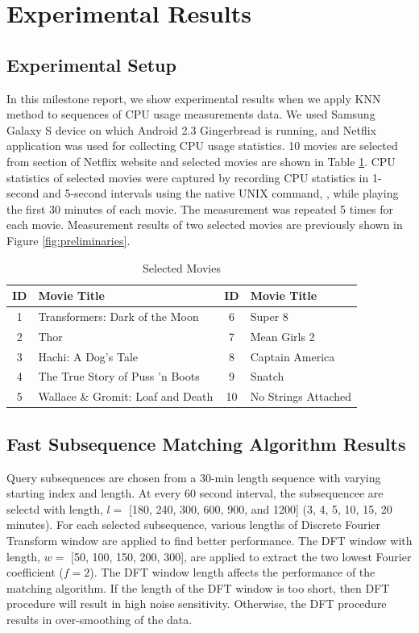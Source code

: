 \section{Experimental Results}
\label{sec:experiments}

\subsection{Experimental Setup}


In this milestone report, we show experimental results when we apply KNN method to sequences of CPU usage measurements data.
We used Samsung Galaxy S device on which Android 2.3 Gingerbread is running, and Netflix application was used for collecting CPU usage statistics.
10 movies are selected from  section of Netflix website and selected movies are shown in Table \ref{tab:movies}.
CPU statistics of selected movies were captured by recording CPU statistics in 1-second and 5-second intervals using the native UNIX command, , while playing the first 30 minutes of each movie. 
The measurement was repeated 5 times for each movie.
Measurement results of two selected movies are previously shown in Figure \ref{fig:preliminaries}.

\begin{table}[h!]
\begin{center}
\begin{tabular}{|c|l|c|l|}
\hline
ID & Movie Title & ID & Movie Title \\ 
\hline
1 & Transformers: Dark of the Moon 		& 6 & Super 8\\
2 & Thor								& 7 & Mean Girls 2 \\
3 & Hachi: A Dog's Tale 					& 8 & Captain America \\
4 & The True Story of Puss 'n Boots 		& 9 &  Snatch \\
5 & Wallace \& Gromit: Loaf and Death 		& 10 & No Strings Attached \\
\hline
\end{tabular}
\end{center}
\caption{Selected Movies}
\label{tab:movies}
\end{table}

\subsection{Fast Subsequence Matching Algorithm Results}
Query subsequences are chosen from a 30-min length sequence with varying starting index and length. At every 60 second interval, the subsequencee are selectd with length, $l =$ [180, 240, 300, 600, 900, and 1200] (3, 4, 5, 10, 15, 20 minutes). For each selected subsequence, various lengths of Discrete Fourier Transform window are applied to find better performance. The DFT window with length, $w=$ [50, 100, 150, 200, 300], are applied to extract the two lowest Fourier coefficient ($f=2$). The DFT window length affects the performance of the matching algorithm. If the length of the DFT window is too short, then DFT procedure will result in high noise sensitivity. Otherwise, the DFT procedure results in over-smoothing of the data.

